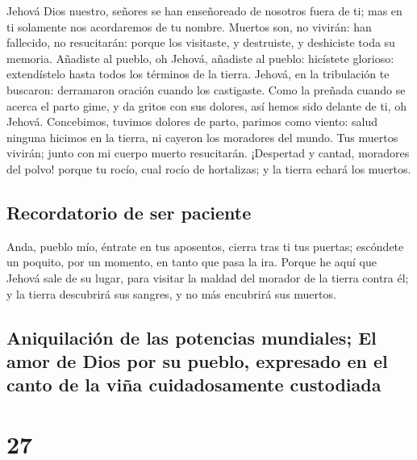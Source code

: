 Jehová Dios nuestro, señores se han enseñoreado de
nosotros fuera de ti; mas en ti solamente nos acordaremos de tu nombre.
 Muertos son, no vivirán: han fallecido, no resucitarán:
porque los visitaste, y destruiste, y deshiciste toda su memoria.
 Añadiste al pueblo, oh Jehová, añadiste al pueblo:
hicístete glorioso: extendístelo hasta todos los términos de la tierra.
 Jehová, en la tribulación te buscaron: derramaron oración
cuando los castigaste.  Como la preñada cuando se acerca el
parto gime, y da gritos con sus dolores, así hemos sido delante de ti,
oh Jehová.  Concebimos, tuvimos dolores de parto, parimos
como viento: salud ninguna hicimos en la tierra, ni cayeron los
moradores del mundo.  Tus muertos vivirán; junto con mi
cuerpo muerto resucitarán. ¡Despertad y cantad, moradores del polvo!
porque tu rocío, cual rocío de hortalizas; y la tierra echará los
muertos.

\hypertarget{recordatorio-de-ser-paciente}{%
\subsection{Recordatorio de ser
paciente}\label{recordatorio-de-ser-paciente}}

 Anda, pueblo mío, éntrate en tus aposentos, cierra tras ti
tus puertas; escóndete un poquito, por un momento, en tanto que pasa la
ira.  Porque he aquí que Jehová sale de su lugar, para
visitar la maldad del morador de la tierra contra él; y la tierra
descubrirá sus sangres, y no más encubrirá sus muertos.

\hypertarget{aniquilaciuxf3n-de-las-potencias-mundiales-el-amor-de-dios-por-su-pueblo-expresado-en-el-canto-de-la-viuxf1a-cuidadosamente-custodiada}{%
\subsection{Aniquilación de las potencias mundiales; El amor de Dios por
su pueblo, expresado en el canto de la viña cuidadosamente
custodiada}\label{aniquilaciuxf3n-de-las-potencias-mundiales-el-amor-de-dios-por-su-pueblo-expresado-en-el-canto-de-la-viuxf1a-cuidadosamente-custodiada}}

\hypertarget{section-26}{%
\section{27}\label{section-26}}

